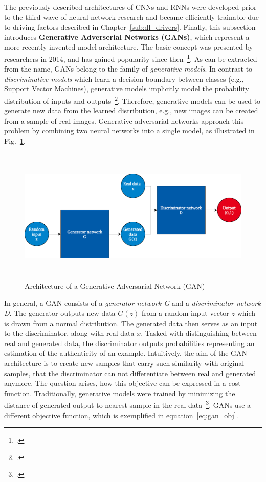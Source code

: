 The previously described architectures of CNNs and RNNs were developed prior to
the third wave of neural network research and became efficiently trainable
due to driving factors described in Chapter~\ref{sub:dl_drivers}.
Finally, this subsection introduces \textbf{Generative Adverserial Networks (GANs)}, which
represent a more recently invented model architecture.
The basic concept was presented by researchers in 2014, and has gained popularity
since then~\footcite{Goodfellow2014}.
As can be extracted from the name, GANs belong to the family of \textit{generative
models}.
In contrast to \textit{discriminative models} which learn a decision boundary
between classes (e.g., Support Vector Machines), generative models implicitly 
model the probability distribution of inputs and outputs~\footcite{Bishop2006}.
Therefore, generative models can be used to generate new data from the learned
distribution, e.g., new images can be created from a sample of real images.
Generative adversarial networks approach this problem by combining two neural 
networks into a single model, as illustrated in Fig.~\ref{fig:gan_architecture}.

\begin{figure}[h]
  \centering
  \includegraphics[height=6.5cm]{img/gan_architecture}
  \caption{Architecture of a Generative Adversarial Network (GAN)}
\label{fig:gan_architecture}
\end{figure}

In general, a GAN consists of a \textit{generator network G} and a \textit{discriminator network D}.
The generator outputs new data $G(z)$ from a random input vector $z$ which is
drawn from a normal distribution.
The generated data then serves as an input to the discriminator, along with
real data $x$.
Tasked with distinguishing between real and generated data, the discriminator
outputs probabilities representing an estimation of the authenticity of an
example.
Intuitively, the aim of the GAN architecture is to create new samples that carry
such similarity with original samples, that the discriminator can not differentiate
between real and generated anymore.
The question arises, how this objective can be expressed in a cost function.
Traditionally, generative models were trained by minimizing the distance of
generated output to nearest sample in the real data~\footcite{Goodfellow2014}.
GANs use a different objective function, which is exemplified in equation~\ref{eq:gan_obj}.

